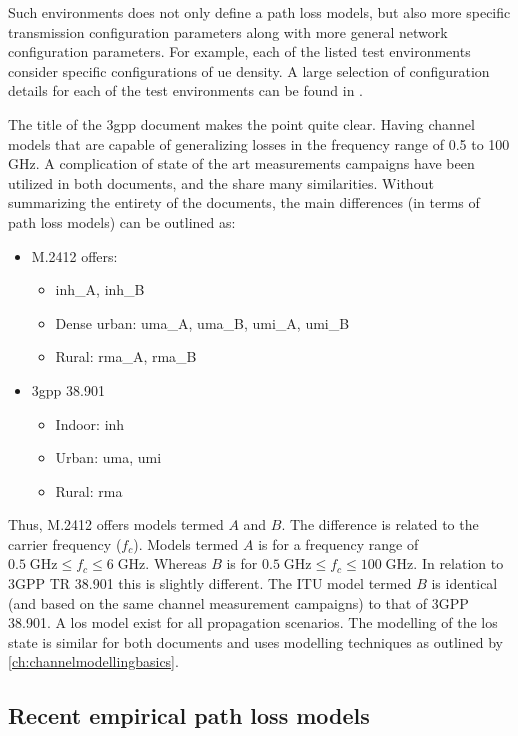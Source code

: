 Such environments does not only define a path loss models, but also more specific transmission configuration parameters along with more general network configuration parameters. For example, each of the listed test environments consider specific configurations of \gls{ue} density. A large selection of configuration details for each of the test environments can be found in \cite{ITU2412}.


The title of the \gls{3gpp} document makes the point quite clear. Having channel models that are capable of generalizing losses in the frequency range of 0.5 to 100 GHz. A complication of state of the art measurements campaigns have been utilized in both documents, and the share many similarities. Without summarizing the entirety of the documents, the main differences (in terms of path loss models) can be outlined as:

\begin{itemize}
\item M.2412 offers:
\begin{itemize}
\item \gls{inh}\_A, \gls{inh}\_B
\item Dense urban: \gls{uma}\_A, \gls{uma}\_B, \gls{umi}\_A, \gls{umi}\_B
\item Rural: \gls{rma}\_A, \gls{rma}\_B
\end{itemize}
\item \gls{3gpp} 38.901
\begin{itemize}
    \item Indoor: \gls{inh}
    \item Urban: \gls{uma}, \gls{umi}
    \item Rural: \gls{rma}
\end{itemize}
\end{itemize}

Thus, M.2412 offers models termed $A$ and $B$. The difference is related to the carrier frequency ($f_c$). Models termed $A$ is for a frequency range of $0.5\; \text{GHz} \leq f_c \leq 6 \;\text{GHz}$. Whereas $B$ is for $0.5 \; \text{GHz} \leq f_c \leq 100 \; \text{GHz}$. In relation to 3GPP TR 38.901 this is slightly different. The ITU model termed $B$ is identical (and based on the same channel measurement campaigns) to that of 3GPP 38.901. A \gls{los} model exist for all propagation scenarios. The modelling of the \gls{los} state is similar for both documents and uses modelling techniques as outlined by \ref{ch:channelmodellingbasics}.

\subsection{Recent empirical path loss models}


